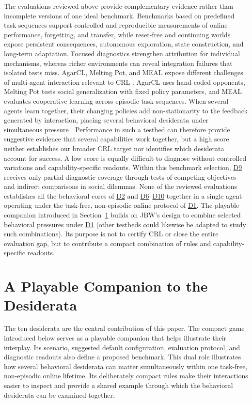 \documentclass[10pt,journal,compsoc]{IEEEtran}
\DeclareRobustCommand{\Dref}[1]{\hyperref[sec:d#1]{D#1}}
\begin{document}
The evaluations reviewed above provide complementary evidence rather than incomplete versions of one ideal benchmark.
Benchmarks based on predefined task sequences support controlled and reproducible measurements of online performance, forgetting, and transfer, while reset-free and continuing worlds expose persistent consequences, autonomous exploration, state construction, and long-term adaptation.
Focused diagnostics strengthen attribution for individual mechanisms, whereas richer environments can reveal integration failures that isolated tests miss.
AgarCL, Melting Pot, and MEAL expose different challenges of multi-agent interaction relevant to CRL \cite{mohamed2026,leibo2021,tomilin2026}.
AgarCL uses hand-coded opponents, Melting Pot tests social generalization with fixed policy parameters, and MEAL evaluates cooperative learning across episodic task sequences.
When several agents learn together, their changing policies add non-stationarity to the feedback generated by interaction, placing several behavioral desiderata under simultaneous pressure \cite{nekoei2021,kim2021}.
Performance in such a testbed can therefore provide suggestive evidence that several capabilities work together, but a high score neither establishes our broader CRL target nor identifies which desiderata account for success.
A low score is equally difficult to diagnose without controlled variations and capability-specific readouts.
Within this benchmark selection, \Dref{9} receives only partial diagnostic coverage through tests of competing objectives and indirect comparisons in social dilemmas.
None of the reviewed evaluations establishes all the behavioral cores of \Dref{2} and \Dref{6}--\Dref{10} together in a single agent operating under the task-free, non-episodic online protocol of \Dref{1}.
The playable companion introduced in Section~\ref{sec:benchmark-proposal} builds on JBW's design to combine selected behavioral pressures under \Dref{1} (other testbeds could likewise be adapted to study such combinations).
Its purpose is not to certify CRL or close the entire evaluation gap, but to contribute a compact combination of rules and capability-specific readouts.

\section{A Playable Companion to the Desiderata}
\label{sec:benchmark-proposal}

The ten desiderata are the central contribution of this paper.
The compact game introduced below serves as a playable companion that helps illustrate their interplay.
Its scenario, suggested default configuration, evaluation protocol, and diagnostic readouts also define a proposed benchmark.
This dual role illustrates how several behavioral desiderata can matter simultaneously within one task-free, non-episodic online lifetime.
Its deliberately compact rules make their interactions easier to inspect and provide a shared example through which the behavioral desiderata can be examined together.
\end{document}
